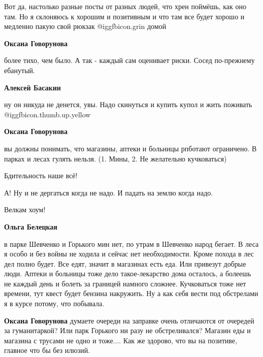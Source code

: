  
 
 
 
 
\qqSecCmt

\begin{itemize} %

Вот да, настолько разные посты от разных людей, что хрен поймёшь, как оно там.
Но я склоняюсь к хорошим и позитивным и что там все будет хорошо и медленно
пакую свой рюкзак  @igg{fbicon.grin} домой

\begin{itemize} %
\textbf{Оксана Говорунова} 

более тихо, чем было. А так - каждый сам оценивает риски. Сосед по-прежнему
ебанутый.

\textbf{Алексей Басакин} 

ну он никуда не денется, увы. Надо скинуться и купить купол и жить поживать
@igg{fbicon.thumb.up.yellow} 

\textbf{Оксана Говорунова} 

вы должны понимать, что магазины, аптеки и больницы рпботают ограничено. В
парках и лесах гулять нельзя. (1. Мины, 2. Не желательно кучковаться)

Бдительность наше всё!

А! Ну и не дергаться когда не надо. И падать на землю когда надо.

Велкам хоум!

\textbf{Ольга Белецкая} 

в парке Шевченко и Горького мин нет, по утрам в Шевченко народ бегает. В леса я
особо и без войны не ходила и сейчас нет необходимости. Кроме похода в лес дел
полно будет. Все едят, значит в магазинах есть еда. Или привезут добрые люди.
Аптеки и больницы тоже дело такое-лекарство дома осталось, а болеешь не каждый
день и болеть за границей намного сложнее. Кучковаться тоже нет времени, тут
квест будет бензина накружить. Ну а как себя вести под обстрелами я в курсе
потому, что побывала.

\textbf{Оксана Говорунова} думаете очереди на заправке очень отличаются от очередей за гуманитаркой?
Или парк Горького ни разу не обстреливался?
Магазин еды и магазина с трусами не одно и тоже....
Как же здорово, что вы на позитиве, главное что бы без илюзий.


\end{itemize}
\end{itemize}
